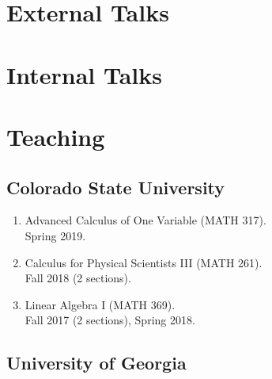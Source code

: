 \documentclass[letterpaper]{article}
\begin{document}

\section*{External Talks}

\nocite{*}
\printbibliography[heading=none,subtype=external,resetnumbers=true]

\section*{Internal Talks}

\nocite{*}
\printbibliography[heading=none,subtype=internal]

\section*{Teaching}

\subsection*{Colorado State University}

\begin{enumerate}
\item Advanced Calculus of One Variable (MATH 317). \\
  Spring 2019.
\item Calculus for Physical Scientists III (MATH 261). \\
  Fall 2018 (2 sections).
\item Linear Algebra I (MATH 369). \\
  Fall 2017 (2 sections), Spring 2018.
\end{enumerate}

\subsection*{University of Georgia}
\end{document}
